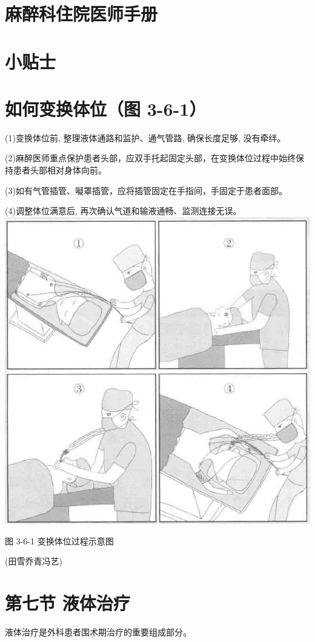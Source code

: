 \documentclass[10pt]{article}
\begin{document}
\section*{麻醉科住院医师手册}
\section*{小贴士}
\section*{如何变换体位（图 3-6-1）}
(1)变换体位前, 整理液体通路和监护、通气管路, 确保长度足够, 没有牵绊。

(2)麻醉医师重点保护患者头部，应双手托起固定头部，在变换体位过程中始终保持患者头部相对身体向前。

(3)如有气管插管、㘈罩插管，应将插管固定在手指间，手固定于患者面部。

(4)调整体位满意后, 再次确认气道和输液通畅、监测连接无误。\\
\includegraphics[max width=\textwidth, center]{2024_07_05_645bb794a4d4f32ee0c8g-114}

图 3-6-1 变换体位过程示意图

(田雪乔青冯艺)

\section*{第七节 液体治疗}
液体治疗是外科患者围术期治疗的重要组成部分。
\end{document}
